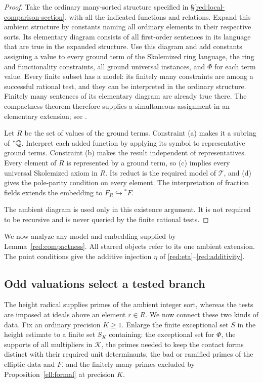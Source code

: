 \begin{proof}
Take the ordinary many-sorted structure specified in
\S\ref{red:local-comparison-section}, with all the indicated functions
and relations. Expand this ambient structure by constants naming all
ordinary elements in their respective sorts. Its elementary diagram
consists of all first-order sentences in its language that are true in
the expanded structure. Use this diagram and add constants
assigning a value to every ground term of the Skolemized ring language,
the ring and functionality constraints, all ground universal instances,
and $\Phi$ for each term value. Every finite subset has a
model: its finitely many constraints are among a successful rational
test, and they can be interpreted in the ordinary structure. Finitely
many sentences of its elementary diagram are already true there.
The compactness theorem therefore supplies a simultaneous assignment
in an elementary extension; see \cite{Marker2002}.

Let $R$ be the set of values of the ground terms. Constraint (a) makes
it a subring of ${}^*\mathbb Q$. Interpret each added function by applying its
symbol to representative ground terms. Constraint (b) makes the result
independent of representatives. Every element of $R$ is represented by
a ground term, so (c) implies every universal Skolemized axiom in $R$.
Its reduct is the required model of $\mathcal T$, and (d) gives the
pole-parity condition on every element. The interpretation of fraction
fields extends the embedding to
$F_R\hookrightarrow{}^*F$.

The ambient diagram is used only in this existence argument. It is not
required to be recursive and is never queried by the finite rational
tests.
\end{proof}

We now analyze any model and embedding supplied by
Lemma~\ref{red:compactness}. All starred objects refer to its one
ambient extension. The point conditions give the additive injection
\(\eta\) of
\eqref{red:eta}--\eqref{red:additivity}.

\subsection{Odd valuations select a tested branch}
\label{red:valuation}

The height radical supplies primes of the ambient integer sort,
whereas the tests are imposed at ideals above an element \(r\in R\).
We now connect these two kinds of data. Fix an ordinary precision
\(K\ge1\). Enlarge the finite exceptional set \(S\) in the height
estimate to a finite set \(S_K\) containing:
the exceptional set for $\Phi$, the supports of all multipliers in
$\mathcal K$, the primes needed to keep the contact forms distinct
with their required unit determinants, the bad or ramified primes of
the elliptic data and $F$, and the finitely many primes excluded by
Proposition~\ref{ell:formal} at precision $K$.

